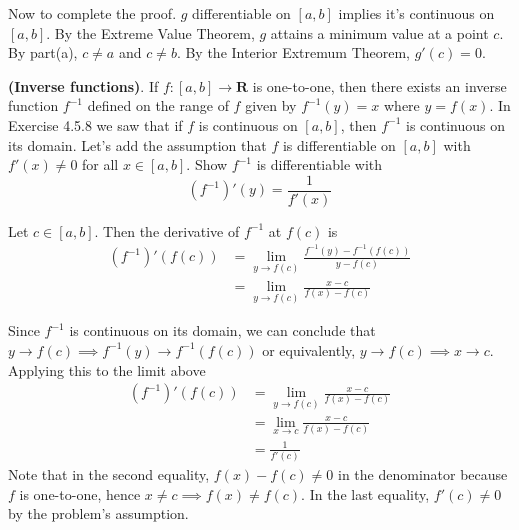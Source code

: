 \documentclass{oxmathproblems}
\begin{document}
\begin{questions}
\begin{solution}
\begin{enumerate}[label=(\alph*)]
    Now to complete the proof. $g$ differentiable on $[a, b]$ implies it's continuous on $[a, b]$. By the Extreme Value Theorem, $g$ attains a minimum value at a
    point $c$. By part(a), $c \neq a$ and $c \neq b$. By the Interior Extremum Theorem, $g'(c) = 0$.
  \end{enumerate}
\end{solution}

\miquestion \textbf{(Inverse functions)}. If $f: [a, b] \to \textbf{R}$ is one-to-one, then there exists an inverse function $f^{-1}$ defined on the range of $f$ given by
$f^{-1}(y)=x$ where $y=f(x)$. In Exercise 4.5.8 we saw that if $f$ is continuous on $[a, b]$, then $f^{-1}$ is continuous on its domain. Let's add the assumption that $f$
is differentiable on $[a, b]$ with $f'(x) \neq 0$ for all $x \in [a, b]$. Show $f^{-1}$ is differentiable with
\[(f^{-1})'(y)=\frac{1}{f'(x)}\]

\begin{solution}
  Let $c \in [a, b]$. Then the derivative of $f^{-1}$ at $f(c)$ is
  \begin{align*}
    (f^{-1})'(f(c)) &= \lim_{y \to f(c)}\frac{f^{-1}(y)-f^{-1}(f(c))}{y-f(c)}\\
    &= \lim_{y \to f(c)}\frac{x-c}{f(x)-f(c)}
  \end{align*}
  
  Since $f^{-1}$ is continuous on its domain, we can conclude that $y \to f(c) \implies f^{-1}(y) \to f^{-1}(f(c))$ or equivalently, $y \to f(c) \implies x \to c$. Applying
  this to the limit above
  \begin{align*}
    (f^{-1})'(f(c)) &=\lim_{y \to f(c)}\frac{x-c}{f(x)-f(c)}\\
    &= \lim_{x \to c}\frac{x-c}{f(x)-f(c)}\\
    &= \frac{1}{f'(c)}
  \end{align*}
  Note that in the second equality, $f(x)-f(c) \neq 0$ in the denominator because $f$ is one-to-one, hence $x \neq c \implies f(x) \neq f(c)$. In the last equality,
  $f'(c) \neq 0$ by the problem's assumption.
\end{solution}

\end{questions}
\end{document}
